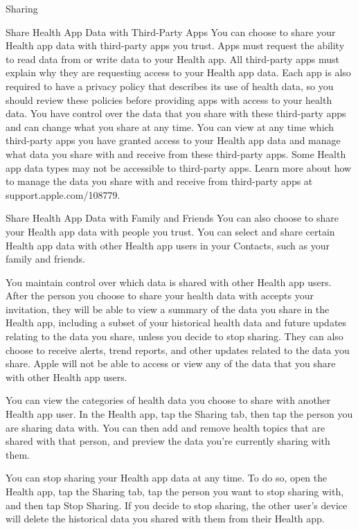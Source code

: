 Sharing

Share Health App Data with Third-Party Apps
You can choose to share your Health app data with third-party apps you trust. Apps must request the ability to read data from or write data to your Health app. All third-party apps must explain why they are requesting access to your Health app data. Each app is also required to have a privacy policy that describes its use of health data, so you should review these policies before providing apps with access to your health data. You have control over the data that you share with these third-party apps and can change what you share at any time. You can view at any time which third-party apps you have granted access to your Health app data and manage what data you share with and receive from these third-party apps. Some Health app data types may not be accessible to third-party apps. Learn more about how to manage the data you share with and receive from third-party apps at support.apple.com/108779.

Share Health App Data with Family and Friends
You can also choose to share your Health app data with people you trust. You can select and share certain Health app data with other Health app users in your Contacts, such as your family and friends.

You maintain control over which data is shared with other Health app users. After the person you choose to share your health data with accepts your invitation, they will be able to view a summary of the data you share in the Health app, including a subset of your historical health data and future updates relating to the data you share, unless you decide to stop sharing. They can also choose to receive alerts, trend reports, and other updates related to the data you share. Apple will not be able to access or view any of the data that you share with other Health app users.

You can view the categories of health data you choose to share with another Health app user. In the Health app, tap the Sharing tab, then tap the person you are sharing data with. You can then add and remove health topics that are shared with that person, and preview the data you’re currently sharing with them.

You can stop sharing your Health app data at any time. To do so, open the Health app, tap the Sharing tab, tap the person you want to stop sharing with, and then tap Stop Sharing. If you decide to stop sharing, the other user’s device will delete the historical data you shared with them from their Health app.

